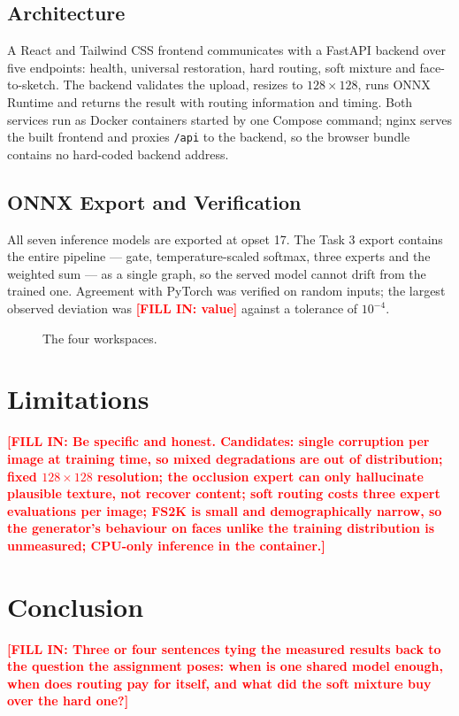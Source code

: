 \documentclass[conference]{IEEEtran}
\newcommand{\PLACEHOLDER}[1]{\textcolor{red}{\textbf{[FILL IN: #1]}}}
\begin{document}
\subsection{Architecture}
A React and Tailwind CSS frontend communicates with a FastAPI backend over five
endpoints: health, universal restoration, hard routing, soft mixture and
face-to-sketch. The backend validates the upload, resizes to $128\times128$,
runs ONNX Runtime and returns the result with routing information and timing.
Both services run as Docker containers started by one Compose command; nginx
serves the built frontend and proxies \texttt{/api} to the backend, so the
browser bundle contains no hard-coded backend address.

\subsection{ONNX Export and Verification}
All seven inference models are exported at opset 17. The Task 3 export contains
the entire pipeline --- gate, temperature-scaled softmax, three experts and the
weighted sum --- as a single graph, so the served model cannot drift from the
trained one. Agreement with PyTorch was verified on random inputs; the largest
observed deviation was \PLACEHOLDER{value} against a tolerance of $10^{-4}$.

\begin{figure}[t]
\centering
\caption{The four workspaces.}
\label{fig:app}
\end{figure}

\section{Limitations}
\PLACEHOLDER{Be specific and honest. Candidates: single corruption per image at
training time, so mixed degradations are out of distribution; fixed
$128\times128$ resolution; the occlusion expert can only hallucinate plausible
texture, not recover content; soft routing costs three expert evaluations per
image; FS2K is small and demographically narrow, so the generator's behaviour
on faces unlike the training distribution is unmeasured; CPU-only inference in
the container.}

\section{Conclusion}
\PLACEHOLDER{Three or four sentences tying the measured results back to the
question the assignment poses: when is one shared model enough, when does
routing pay for itself, and what did the soft mixture buy over the hard one?}
\end{document}
